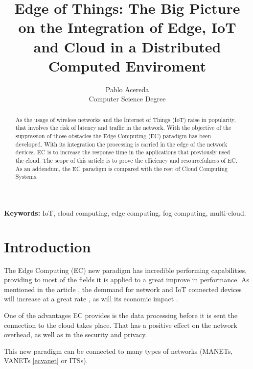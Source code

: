 \documentclass[10pt]{article}
\title{
    Edge of Things: The Big Picture on the Integration of Edge, IoT and Cloud in
    a Distributed Computed Enviroment
}
\author{
Pablo Acereda\\
Computer Science Degree\\
}
\begin{document}
\maketitle

\begin{abstract}

    As the usage of wireless networks and the Internet of Things (IoT) raise in
    popularity, that involves the risk of latency and traffic in the network.
    With the objective of the suppression of those obstacles the Edge Computing
    (EC) paradigm has been developed. With its integration the processing is
    carried in the edge of the network devices. EC is to increase the response
    time in the applications that previously used the cloud. The scope of this
    article is to prove the efficiency and resourcefulness of EC. As an
    addendum, the EC paradigm is compared with the rest of Cloud Computing
    Systems.

\end{abstract}

{\bf Keywords:}
    IoT, 
    cloud computing, 
    edge computing, 
    fog computing, 
    multi-cloud.

\section{Introduction}

The Edge Computing (EC) new paradigm has incredible performing capabilities,
providing to most of the fields it is applied to a great improve in performance.
As mentioned in the article \cite{artiot}, the demmand for network and IoT
connected devices will increase at a great rate \cite{things} 
, as will its economic impact \cite{trillion} 
.

One of the advantages EC provides is the data processing before it is sent the
connection to the cloud takes place. That has a positive effect on the network
overhead, as well as in the security and privacy.

This new paradigm can be connected to many types of networks (MANETs, VANETs 
\hyperref[ecvanet]{\ref{ecvanet}} or ITSs).
\end{document}
